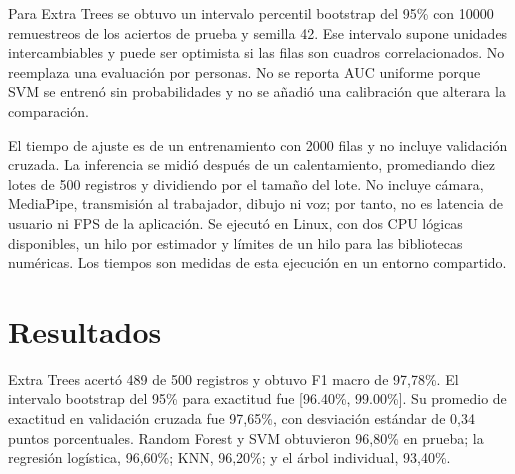 \documentclass[11pt,a4paper]{article}
\begin{document}
Para Extra Trees se obtuvo un intervalo percentil bootstrap del 95\% con 10000 remuestreos de los aciertos de prueba y semilla 42. Ese intervalo supone unidades intercambiables y puede ser optimista si las filas son cuadros correlacionados. No reemplaza una evaluación por personas. No se reporta AUC uniforme porque SVM se entrenó sin probabilidades y no se añadió una calibración que alterara la comparación.

El tiempo de ajuste es de un entrenamiento con 2000 filas y no incluye validación cruzada. La inferencia se midió después de un calentamiento, promediando diez lotes de 500 registros y dividiendo por el tamaño del lote. No incluye cámara, MediaPipe, transmisión al trabajador, dibujo ni voz; por tanto, no es latencia de usuario ni FPS de la aplicación. Se ejecutó en Linux, con dos CPU lógicas disponibles, un hilo por estimador y límites de un hilo para las bibliotecas numéricas. Los tiempos son medidas de esta ejecución en un entorno compartido.

\section{Resultados}
\begin{table}[ht]
\centering\small
\caption{Resultados en 500 registros reservados. Exactitud, precisión, recall y F1 se expresan en porcentaje.}
\end{table}
Extra Trees acertó 489 de 500 registros y obtuvo F1 macro de 97,78\%. El intervalo bootstrap del 95\% para exactitud fue [96.40\%, 99.00\%]. Su promedio de exactitud en validación cruzada fue 97,65\%, con desviación estándar de 0,34 puntos porcentuales. Random Forest y SVM obtuvieron 96,80\% en prueba; la regresión logística, 96,60\%; KNN, 96,20\%; y el árbol individual, 93,40\%.
\end{document}
